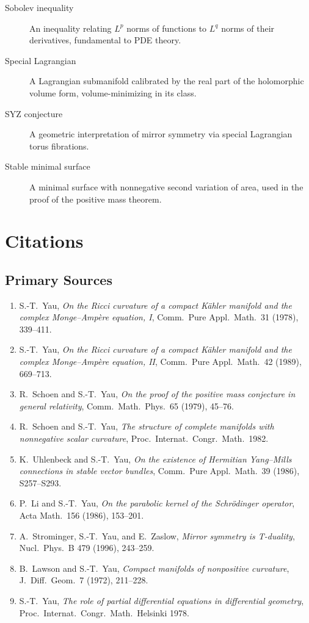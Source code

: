 \begin{description}
    \item[Sobolev inequality] An inequality relating $L^p$ norms of functions to $L^q$ norms of their derivatives, fundamental to PDE theory.
    \item[Special Lagrangian] A Lagrangian submanifold calibrated by the real part of the holomorphic volume form, volume-minimizing in its class.
    \item[SYZ conjecture] A geometric interpretation of mirror symmetry via special Lagrangian torus fibrations.
    \item[Stable minimal surface] A minimal surface with nonnegative second variation of area, used in the proof of the positive mass theorem.
\end{description}

\section{Citations}
\subsection*{Primary Sources}
\begin{enumerate}
    \item S.-T.\ Yau, \textit{On the Ricci curvature of a compact K\"ahler manifold and the complex Monge--Amp\`ere equation, I}, Comm.\ Pure Appl.\ Math.\ 31 (1978), 339--411.
    \item S.-T.\ Yau, \textit{On the Ricci curvature of a compact K\"ahler manifold and the complex Monge--Amp\`ere equation, II}, Comm.\ Pure Appl.\ Math.\ 42 (1989), 669--713.
    \item R.\ Schoen and S.-T.\ Yau, \textit{On the proof of the positive mass conjecture in general relativity}, Comm.\ Math.\ Phys.\ 65 (1979), 45--76.
    \item R.\ Schoen and S.-T.\ Yau, \textit{The structure of complete manifolds with nonnegative scalar curvature}, Proc.\ Internat.\ Congr.\ Math.\ 1982.
    \item K.\ Uhlenbeck and S.-T.\ Yau, \textit{On the existence of Hermitian Yang--Mills connections in stable vector bundles}, Comm.\ Pure Appl.\ Math.\ 39 (1986), S257--S293.
    \item P.\ Li and S.-T.\ Yau, \textit{On the parabolic kernel of the Schr\"odinger operator}, Acta Math.\ 156 (1986), 153--201.
    \item A.\ Strominger, S.-T.\ Yau, and E.\ Zaslow, \textit{Mirror symmetry is T-duality}, Nucl.\ Phys.\ B 479 (1996), 243--259.
    \item B.\ Lawson and S.-T.\ Yau, \textit{Compact manifolds of nonpositive curvature}, J.\ Diff.\ Geom.\ 7 (1972), 211--228.
    \item S.-T.\ Yau, \textit{The role of partial differential equations in differential geometry}, Proc.\ Internat.\ Congr.\ Math.\ Helsinki 1978.
\end{enumerate}

